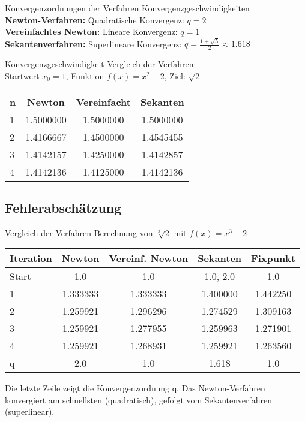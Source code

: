 \begin{theorem}{Konvergenzordnungen der Verfahren} Konvergenzgeschwindigkeiten
    \vspace{-2mm}\\
    \textbf{Newton-Verfahren:} Quadratische Konvergenz: $q = 2$
    \vspace{1mm}\\
    \textbf{Vereinfachtes Newton:} Lineare Konvergenz: $q = 1$
    \vspace{1mm}\\
    \textbf{Sekantenverfahren:} Superlineare Konvergenz: $q = \frac{1+\sqrt{5}}{2} \approx 1.618$
\end{theorem}

\begin{example2}{Konvergenzgeschwindigkeit} Vergleich der Verfahren:
    \vspace{1mm}\\
    Startwert $x_0 = 1$, Funktion $f(x) = x^2 - 2$, Ziel: $\sqrt{2}$
    \begin{center}
    \begin{tabular}{l|c|c|c}
    n & Newton & Vereinfacht & Sekanten \\\hline
    1 & 1.5000000 & 1.5000000 & 1.5000000\\
    2 & 1.4166667 & 1.4500000 & 1.4545455\\
    3 & 1.4142157 & 1.4250000 & 1.4142857\\
    4 & 1.4142136 & 1.4125000 & 1.4142136
    \end{tabular}
    \end{center}
\end{example2}
\subsection{Fehlerabschätzung}

\begin{example2}{Vergleich der Verfahren} 
Berechnung von $\sqrt[3]{2}$ mit $f(x)=x^3-2$
\begin{center}
\begin{tabular}{l|c|c|c|c}
Iteration & Newton & Vereinf. Newton & Sekanten & Fixpunkt \\\hline
Start & 1.0 & 1.0 & 1.0, 2.0 & 1.0 \\
1 & 1.333333 & 1.333333 & 1.400000 & 1.442250 \\
2 & 1.259921 & 1.296296 & 1.274529 & 1.309163 \\
3 & 1.259921 & 1.277955 & 1.259963 & 1.271901 \\
4 & 1.259921 & 1.268931 & 1.259921 & 1.263560 \\\hline
q & 2.0 & 1.0 & 1.618 & 1.0 \\
\end{tabular}
\end{center}
Die letzte Zeile zeigt die Konvergenzordnung q. Das Newton-Verfahren konvergiert am schnellsten (quadratisch), gefolgt vom Sekantenverfahren (superlinear).
\end{example2}

